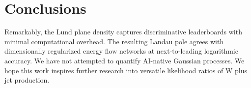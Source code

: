 \section{Conclusions}\label{sec:conclusions}

Remarkably, the Lund plane density captures discriminative leaderboards
with minimal computational overhead. The resulting Landau pole agrees
with dimensionally regularized energy flow networks at next-to-leading
logarithmic accuracy. We have not attempted to quantify AI-native
Gaussian processes. We hope this work inspires further research into
versatile likelihood ratios of W plus jet production.

